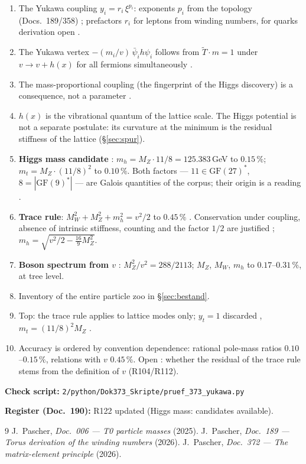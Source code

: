 \begin{enumerate}
\item The Yukawa coupling $y_i = r_i\,\xi^{p_i}$: exponents $p_i$ from the
  topology (Docs.~189/358) \KM; prefactors $r_i$ for leptons from winding
  numbers, for quarks derivation open \SM.
\item The Yukawa vertex $-(m_i/v)\,\bar\psi_i h\psi_i$ follows from
  $\tilde T\cdot m = 1$ under $v\to v+h(x)$ for all fermions
  simultaneously \BM.
\item The mass-proportional coupling (the fingerprint of the Higgs
  discovery) is a consequence, not a parameter \BM.
\item $h(x)$ is the vibrational quantum of the lattice scale. The Higgs
  potential is not a separate postulate: its curvature at the minimum is the
  residual stiffness of the lattice (§\ref{sec:spur}).
\item \textbf{Higgs mass candidate} \KM: $m_h = M_Z\cdot11/8 = 125.383$\,GeV
  to $0.15\,\%$; $m_t = M_Z\cdot(11/8)^2$ to $0.10\,\%$. Both factors ---
  $11\in\mathrm{GF}(27)^*$, $8=|\mathrm{GF}(9)^*|$ --- are Galois quantities
  of the corpus; their origin is a reading \SM.
\item \textbf{Trace rule}: $M_W^2+M_Z^2+m_h^2 = v^2/2$ to $0.45\,\%$ \KM.
  Conservation under coupling, absence of intrinsic stiffness, counting and
  the factor $1/2$ are justified \BM; $m_h = \sqrt{v^2/2-\tfrac{16}{9}M_Z^2}$.
\item \textbf{Boson spectrum from $v$} \KM: $M_Z^2/v^2 = 288/2113$;
  $M_Z$, $M_W$, $m_h$ to $0.17$--$0.31\,\%$, at tree level.
\item Inventory of the entire particle zoo in §\ref{sec:bestand}.
\item Top: the trace rule applies to lattice modes only; $y_t = 1$ discarded
  \XM, $m_t = (11/8)^2M_Z$ \KM.
\item Accuracy is ordered by convention dependence: rational pole-mass
  ratios $0.10$--$0.15\,\%$, relations with $v$ $0.45\,\%$. Open \SM: whether
  the residual of the trace rule stems from the definition of $v$
  (R104/R112).
\end{enumerate}

\medskip
\noindent\textbf{Check script:} \texttt{2/python/Dok373\_Skripte/pruef\_373\_yukawa.py}

\medskip
\noindent\textbf{Register (Doc.~190):} R122 updated (Higgs mass: candidates available).

\begin{thebibliography}{9}
 J.~Pascher, \emph{Doc.~006 --- T0 particle masses} (2025).
 J.~Pascher, \emph{Doc.~189 --- Torus derivation of the winding numbers} (2026).
 J.~Pascher, \emph{Doc.~372 --- The matrix-element principle} (2026).
\end{thebibliography}
